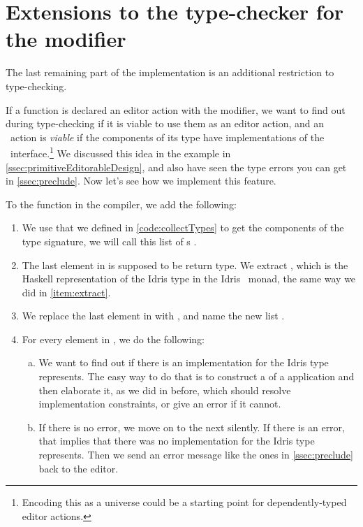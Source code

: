 \section{Extensions to the type-checker for the  modifier}\label{sec:extCheck}

The last remaining part of the implementation is an additional restriction to
type-checking.

If a function is declared an editor action with the  modifier, we
want to find out during type-checking if it is viable to use them as an editor
action, and an \Elab\ action is \emph{viable} if the components of its type have
implementations of the \Editorable\ interface.\footnote{Encoding this as a universe could be a starting point for dependently-typed editor actions.}
We discussed this idea in the 
example in \autoref{ssec:primitiveEditorableDesign}, and also have seen the
type errors you can get in \autoref{ssec:preclude}. Now let's see how we
implement this feature.

To the  function in the compiler, we add the following:
\begin{enumerate}
  \item We use  that we defined in \autoref{code:collectTypes} to get the components of the type signature, we will call this list of s .
  \item The last element in  is supposed to be return type. We
    extract , which is the Haskell representation of the Idris
    type in the Idris \Elab\ monad, the same way we did in
    \autoref{item:extract}.
  \item We replace the last element in  with ,
    and name the new list .
  \item For every element  in , we do the following:
    \begin{enumerate}[(a)]
      \item We want to find out if there is an  implementation
        for the Idris type  represents. The easy way to do that is to
        construct a  of a  application and then
        elaborate it, as we did in \label{item:fromEditor} before, which should
        resolve implementation constraints, or give an error if it cannot.
      \item If there is no error, we move on to the next  silently.
        If there is an error, that implies that there was no 
        implementation for the Idris type  represents. Then we send an
        error message like the ones in \autoref{ssec:preclude} back to the editor.
    \end{enumerate}
\end{enumerate}

